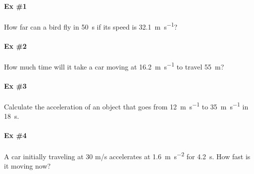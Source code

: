 \documentclass[12pt]{article}
\begin{document}
\pagestyle{empty}

\paragraph{Ex \#1} How far can a bird fly in \SI{50}{\second} if its speed is \SI{32.1}{\meter\per\second}?

\paragraph{Ex \#2} How much time will it take a car moving at \SI{16.2}{\meter\per\second} to travel \SI{55}{\meter}?

\pagebreak

\paragraph{Ex \#3} Calculate the acceleration of an object that goes from \SI{12}{\meter\per\second} to \SI{35}{\meter\per\second} in \SI{18}{\second}.

\paragraph{Ex \#4} A car initially traveling at 30 m/s accelerates at \SI{1.6}{\meter\per\second^2} for \SI{4.2}{\second}.  How fast is it moving now?
\end{document}
